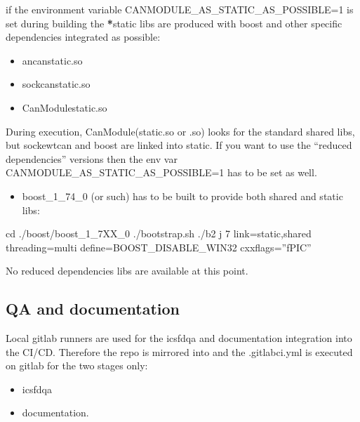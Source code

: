 \documentclass[a4paper,10pt,english]{sphinxmanual}
\begin{document}
if the environment variable CANMODULE\_AS\_STATIC\_AS\_POSSIBLE=1 is set during building the {\color{red}\bfseries{}*}\sphinxhyphen{}static
libs are produced with boost and other specific dependencies integrated as possible:
\begin{itemize}
\item {} 
ancan\sphinxhyphen{}static.so

\item {} 
sockcan\sphinxhyphen{}static.so

\item {} 
CanModule\sphinxhyphen{}static.so

\end{itemize}

During execution, CanModule(\sphinxhyphen{}static.so or .so) looks for the standard shared libs, but sockewtcan and boost
are linked into static.
If you want to use the “reduced dependencies” versions then the env var CANMODULE\_AS\_STATIC\_AS\_POSSIBLE=1
has to be set  as well.
\begin{itemize}
\item {} 
boost\_1\_74\_0 (or such) has to be built to provide both shared and static libs:

\end{itemize}

cd ./boost/boost\_1\_7XX\_0
./bootstrap.sh
./b2 \sphinxhyphen{}j 7 link=static,shared threading=multi define=BOOST\_DISABLE\_WIN32 cxxflags=”\sphinxhyphen{}fPIC”


No reduced dependencies libs are available at this point.


\subsection{QA and documentation}
\label{\detokenize{building:qa-and-documentation}}
Local gitlab runners are used for the ics\sphinxhyphen{}fd\sphinxhyphen{}qa and documentation integration into the CI/CD. Therefore the 
repo is mirrored into  and the .gitlab\sphinxhyphen{}ci.yml is executed on gitlab for the two stages only:
\begin{itemize}
\item {} 
ics\sphinxhyphen{}fd\sphinxhyphen{}qa

\item {} 
documentation.

\end{itemize}
\end{document}
